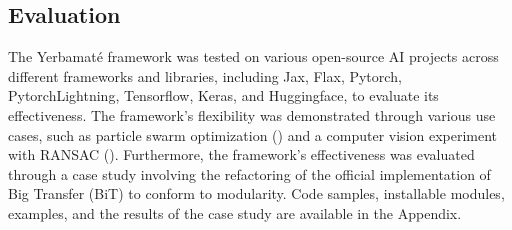 



\subsection{Evaluation}

The Yerbamaté framework was tested on various open-source AI projects across different frameworks and libraries, including Jax, Flax, Pytorch, Pytorch\-Lightning, Tensorflow, Keras, and Huggingface, to evaluate its effectiveness. The framework's flexibility was demonstrated through various use cases, such as particle swarm optimization (\cite{kennedy1995particle}) and a computer vision experiment with RANSAC (\cite{lowe2004distinctive}). Furthermore, the framework's effectiveness was evaluated through a case study involving the refactoring of the official implementation of Big Transfer (BiT) to conform to modularity. Code samples, installable modules, examples, and the results of the case study are available in the Appendix.


